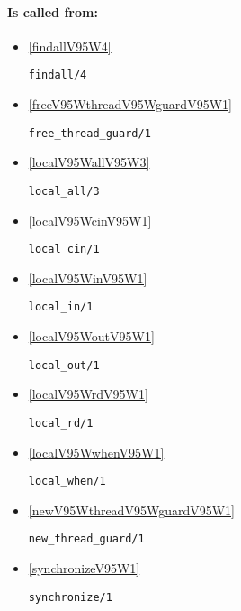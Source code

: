 \paragraph{Is called from:} 
\begin{itemize}
\item \ref{findallV95W4} 
\begin{verbatim}
findall/4
\end{verbatim}

\item \ref{freeV95WthreadV95WguardV95W1} 
\begin{verbatim}
free_thread_guard/1
\end{verbatim}

\item \ref{localV95WallV95W3} 
\begin{verbatim}
local_all/3
\end{verbatim}

\item \ref{localV95WcinV95W1} 
\begin{verbatim}
local_cin/1
\end{verbatim}

\item \ref{localV95WinV95W1} 
\begin{verbatim}
local_in/1
\end{verbatim}

\item \ref{localV95WoutV95W1} 
\begin{verbatim}
local_out/1
\end{verbatim}

\item \ref{localV95WrdV95W1} 
\begin{verbatim}
local_rd/1
\end{verbatim}

\item \ref{localV95WwhenV95W1} 
\begin{verbatim}
local_when/1
\end{verbatim}

\item \ref{newV95WthreadV95WguardV95W1} 
\begin{verbatim}
new_thread_guard/1
\end{verbatim}

\item \ref{synchronizeV95W1} 
\begin{verbatim}
synchronize/1
\end{verbatim}

\end{itemize}

